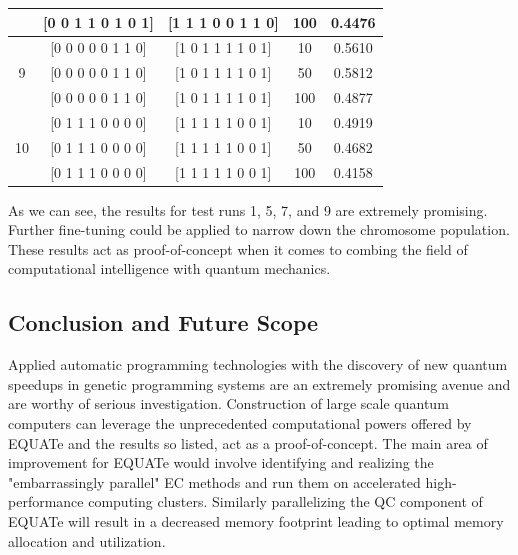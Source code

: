 \documentclass[conference]{IEEEtran}
\begin{document}
\begin{table}[!t]
{\begin{tabular}{| c | c | c | c | c |}
 & [0 0 1 1 0 1 0 1] & [1 1 1 0 0 1 1 0] & 100 & 0.4476 \\
\hline
 & [0 0 0 0 0 1 1 0] & [1 0 1 1 1 1 0 1] & 10 & 0.5610 \\
9 & [0 0 0 0 0 1 1 0] & [1 0 1 1 1 1 0 1] & 50 & 0.5812 \\
 & [0 0 0 0 0 1 1 0] & [1 0 1 1 1 1 0 1] & 100 & 0.4877 \\
\hline
 & [0 1 1 1 0 0 0 0] & [1 1 1 1 1 0 0 1] & 10  & 0.4919 \\
10 & [0 1 1 1 0 0 0 0] & [1 1 1 1 1 0 0 1] & 50  & 0.4682 \\
 & [0 1 1 1 0 0 0 0] & [1 1 1 1 1 0 0 1] & 100  & 0.4158 \\
\hline
\end{tabular}
}
\end{table}

As we can see, the results for test runs 1, 5, 7, and 9 are extremely promising. Further fine-tuning could be applied to narrow down the chromosome population. These results act as proof-of-concept when it comes to combing the field of computational intelligence with quantum mechanics. 

\subsection{Conclusion and Future Scope}

Applied automatic programming technologies with the discovery of new quantum speedups in genetic programming systems are an extremely promising avenue and are worthy of serious investigation. Construction of large scale quantum computers can leverage the unprecedented computational powers offered by EQUATe and the results so listed, act as a proof-of-concept. The main area of improvement for EQUATe would involve identifying and realizing the "embarrassingly parallel" EC methods and run them on accelerated high-performance computing clusters. Similarly parallelizing the QC component of EQUATe will result in a decreased memory footprint leading to optimal memory allocation and utilization.
\end{document}
